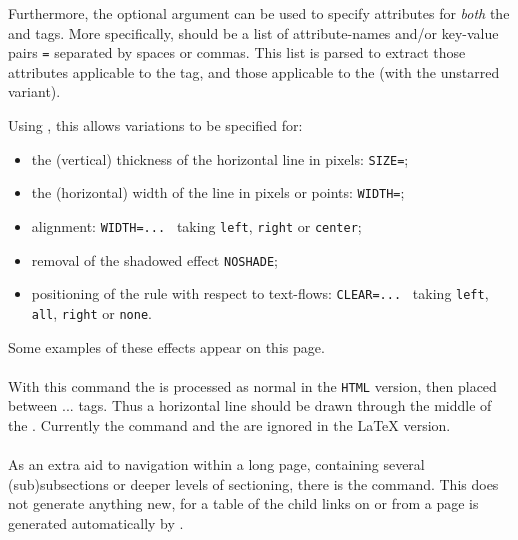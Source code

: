 \htmlrule[center,width=200]

\noindent
Furthermore, the optional argument  can be used to specify 
attributes for \emph{both} the  and  tags. 
More specifically,  should be a list of attribute-names 
and/or key-value pairs \texttt{=} separated by spaces or commas. 
This list is parsed to extract those attributes applicable to the  tag,
and those applicable to the  (with the unstarred variant).

\medskip\htmlrule[right,width=200,size=5]
\noindent
Using \HTMLiii, this allows variations to be specified for:
\begin{itemize}
\item 
the (vertical) thickness of the horizontal line in pixels: \texttt{SIZE=};
\item 
the (horizontal) width of the line in pixels or points: \texttt{WIDTH=};
\item 
alignment: \texttt{WIDTH=... } 
taking \texttt{left}, \texttt{right} or \texttt{center};
\item 
removal of the shadowed effect \texttt{NOSHADE};
\item 
positioning of the rule with respect to text-flows: 
\texttt{CLEAR=... } 
taking \texttt{left}, \texttt{all}, \texttt{right} or \texttt{none}. 
\htmlrule[right,width=200,size=5]
\end{itemize}%
Some examples of these effects appear on 
 this page.%


%
\paragraph*{\texttt{}\label{strikeout}}
With this command the  is processed as normal in the \texttt{HTML} version,
then placed between ... tags.
Thus a horizontal line should be drawn through the middle of the .\html{\\}
Currently the command and the  are ignored in the \LaTeX{} version.%


%
\paragraph*{\label{tochlinks}}
As an extra aid to navigation within a long page, 
containing several (sub)subsections or deeper levels of sectioning,
there is the  command.
This does not generate anything new, for a table of the child links
on or from a page is generated automatically by \latextohtml.

